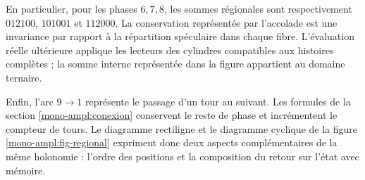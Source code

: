 En particulier, pour les phases \(6,7,8\), les sommes régionales sont
respectivement \(012100\), \(101001\) et \(112000\). La conservation
représentée par l'accolade est une invariance par rapport à la répartition
spéculaire dans chaque fibre. L'évaluation réelle ultérieure applique les
lecteurs des cylindres compatibles aux histoires complètes ; la
somme interne représentée dans la figure appartient au domaine ternaire.

Enfin, l'arc \(9\to1\) représente le passage d'un tour au suivant. Les formules de la section \ref{mono-ampl:conexion} conservent le reste de phase et incrémentent le compteur de tours. Le diagramme rectiligne et le diagramme cyclique de la figure \ref{mono-ampl:fig-regional} expriment donc deux aspects complémentaires de la même holonomie : l'ordre des positions et la composition du retour sur l'état avec mémoire.
